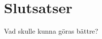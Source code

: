 \documentclass[tekniskrapport/tech.tex]{subfiles}
\begin{document}
\section{Slutsatser}
Vad skulle kunna göras bättre?
\end{document}

